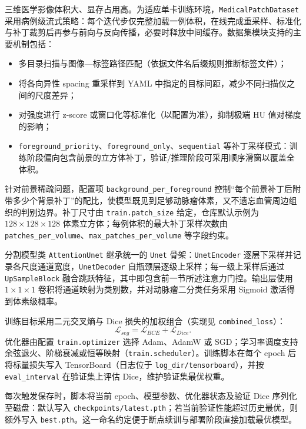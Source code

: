 三维医学影像体积大、显存占用高。为适应单卡训练环境，\texttt{MedicalPatchDataset} 采用病例级流式策略：每个迭代步仅完整加载一例体积，在线完成重采样、标准化与补丁裁剪后再参与前向与反向传播，必要时释放中间缓存。数据集模块支持的主要机制包括：
\begin{itemize}
	\item 多目录扫描与图像—标签路径匹配（依据文件名后缀规则推断标签文件）；
	\item 将各向异性 spacing 重采样到 YAML 中指定的目标间距，减少不同扫描仪之间的尺度差异；
	\item 对强度进行 z-score 或窗口化等标准化（以配置为准），抑制极端 HU 值对梯度的影响；
	\item \texttt{foreground\_priority}、\texttt{foreground\_only}、\texttt{sequential} 等补丁采样模式：训练阶段偏向包含前景的立方体补丁，验证/推理阶段可采用顺序滑窗以覆盖全体积。
\end{itemize}

针对前景稀疏问题，配置项 \texttt{background\_per\_foreground} 控制“每个前景补丁后附带多少个背景补丁”的配比，使模型既见到足够动脉瘤体素，又不遗忘血管周边组织的判别边界。补丁尺寸由 \texttt{train.patch\_size} 给定，仓库默认示例为 $128\times128\times128$ 体素立方体；每例体积的最大补丁采样次数由 \texttt{patches\_per\_volume}、\texttt{max\_patches\_per\_volume} 等字段约束。

分割模型类 \texttt{AttentionUnet} 继承统一的 \texttt{Unet} 骨架：\texttt{UnetEncoder} 逐层下采样并记录各尺度通道宽度，\texttt{UnetDecoder} 自瓶颈层逐级上采样；每一级上采样后通过 \texttt{UpSampleBlock} 融合跳跃特征，其中即包含前一节所述注意力门控。输出层使用 $1\times1\times1$ 卷积将通道映射为类别数，并对动脉瘤二分类任务采用 Sigmoid 激活得到体素级概率。

训练目标采用二元交叉熵与 Dice 损失的加权组合（实现见 \texttt{combined\_loss}）：
\begin{equation}
\mathcal{L}_{seg} = \mathcal{L}_{BCE} + \mathcal{L}_{Dice}.
\end{equation}
优化器由配置 \texttt{train.optimizer} 选择 Adam、AdamW 或 SGD；学习率调度支持余弦退火、阶梯衰减或恒等映射（\texttt{train.scheduler}）。训练脚本在每个 epoch 后将标量损失写入 TensorBoard（日志位于 \texttt{log\_dir/tensorboard}），并按 \texttt{eval\_interval} 在验证集上评估 Dice，维护验证集最优权重。

每次触发保存时，脚本将当前 epoch、模型参数、优化器状态及验证 Dice 序列化至磁盘：默认写入 \texttt{checkpoints/latest.pth}；若当前验证性能超过历史最优，则额外写入 \texttt{best.pth}。这一命名约定便于断点续训与部署阶段直接加载最优模型。

